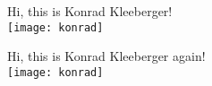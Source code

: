 \begin{frame}
  \begin{center}
    Hi, this is Konrad Kleeberger! \\
    \vspace{0.25cm}
    \texttt{[image: konrad]} \\
  \end{center}
\end{frame}

\begin{frame}
  \begin{center}
    Hi, this is Konrad Kleeberger again! \\
    \vspace{0.25cm}
    \texttt{[image: konrad]} \\
  \end{center}
\end{frame}